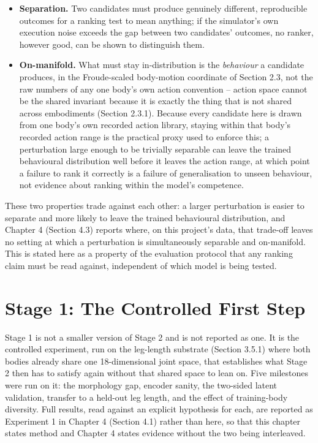 \documentclass[12pt,a4paper,oneside]{report}
\begin{document}
\begin{itemize}[label=--]
\item \textbf{Separation.} Two candidates must produce genuinely different, reproducible outcomes for a ranking
  test to mean anything; if the simulator's own execution noise exceeds the gap between two candidates' outcomes,
  no ranker, however good, can be shown to distinguish them.
\item \textbf{On-manifold.} What must stay in-distribution is the \emph{behaviour} a candidate produces, in the
  Froude-scaled body-motion coordinate of Section 2.3, not the raw numbers of any one body's own action
  convention -- action space cannot be the shared invariant because it is exactly the thing that is not shared
  across embodiments (Section 2.3.1). Because every candidate here is drawn from one body's own recorded action
  library, staying within that body's recorded action range is the practical proxy used to enforce this; a
  perturbation large enough to be trivially separable can leave the trained behavioural distribution well before it
  leaves the action range, at which point a failure to rank it correctly is a failure of generalisation to
  unseen behaviour, not evidence about ranking within the model's competence.
\end{itemize}

These two properties trade against each other: a larger perturbation is easier to separate and more likely to
leave the trained behavioural distribution, and Chapter 4 (Section 4.3) reports where, on this project's data,
that trade-off leaves no setting at which a perturbation is simultaneously separable and on-manifold. This is
stated here as a property of the evaluation protocol that any ranking claim must be read against, independent of
which model is being tested.

\section{Stage 1: The Controlled First Step}
Stage 1 is not a smaller version of Stage 2 and is not reported as one. It is the controlled experiment, run on
the leg-length substrate (Section 3.5.1) where both bodies already share one 18-dimensional joint space, that
establishes what Stage 2 then has to satisfy again without that shared space to lean on. Five milestones were run
on it: the morphology gap, encoder sanity, the two-sided latent validation, transfer to a held-out leg length, and
the effect of training-body diversity. Full results, read against an explicit hypothesis for each, are reported as
Experiment 1 in Chapter 4 (Section 4.1) rather than here, so that this chapter states method and Chapter 4 states
evidence without the two being interleaved.
\end{document}
